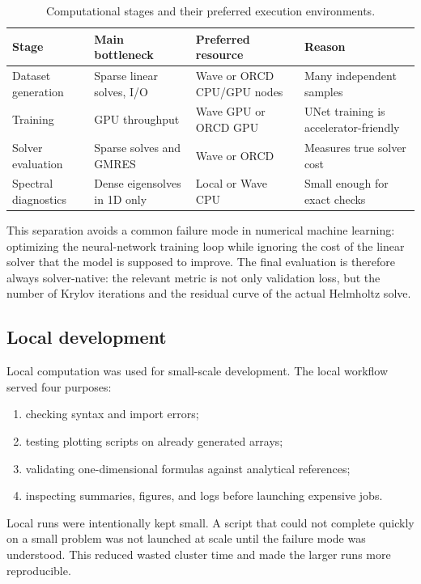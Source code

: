 \begin{table}[h]
\centering
\begin{tabular}{llll}
\toprule
Stage & Main bottleneck & Preferred resource & Reason \\
\midrule
Dataset generation & Sparse linear solves, I/O & Wave or ORCD CPU/GPU nodes &
Many independent samples \\
Training & GPU throughput & Wave GPU or ORCD GPU &
UNet training is accelerator-friendly \\
Solver evaluation & Sparse solves and GMRES & Wave or ORCD &
Measures true solver cost \\
Spectral diagnostics & Dense eigensolves in 1D only & Local or Wave CPU &
Small enough for exact checks \\
\bottomrule
\end{tabular}
\caption{Computational stages and their preferred execution environments.}
\label{tab:computational_stages}
\end{table}

This separation avoids a common failure mode in numerical machine learning:
optimizing the neural-network training loop while ignoring the cost of the
linear solver that the model is supposed to improve. The final evaluation is
therefore always solver-native: the relevant metric is not only validation
loss, but the number of Krylov iterations and the residual curve of the actual
Helmholtz solve.


\subsection{Local development}
\label{subsec:computational_local}

Local computation was used for small-scale development. The local workflow
served four purposes:
\begin{enumerate}
    \item checking syntax and import errors;
    \item testing plotting scripts on already generated arrays;
    \item validating one-dimensional formulas against analytical references;
    \item inspecting summaries, figures, and logs before launching expensive
    jobs.
\end{enumerate}
Local runs were intentionally kept small. A script that could not complete
quickly on a small problem was not launched at scale until the failure mode
was understood. This reduced wasted cluster time and made the larger runs more
reproducible.


